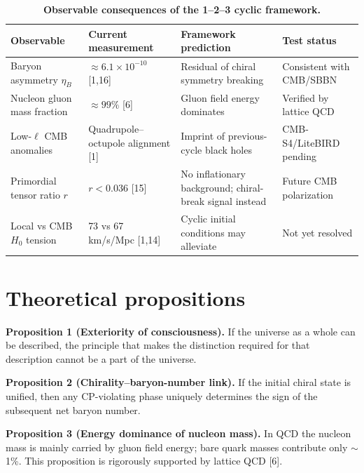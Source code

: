 \documentclass[11pt,a4paper]{article}
\begin{document}
\begin{table}[htbp] \centering \caption{\textbf{Observable consequences of the 1--2--3 cyclic framework.}} \label{tab:predictions} \small \begin{tabular}{@{}p{2.8cm}p{3.6cm}p{4.8cm}p{2.2cm}@{}} \toprule Observable & Current measurement & Framework prediction & Test status \\ \midrule Baryon asymmetry $\eta_B$ & $\approx6.1\times10^{-10}$ [1,16] & Residual of chiral symmetry breaking & Consistent with CMB/SBBN \\ Nucleon gluon mass fraction & $\approx99\%$ [6] & Gluon field energy dominates & Verified by lattice QCD \\ Low-$\ell$ CMB anomalies & Quadrupole--octupole alignment [1] & Imprint of previous-cycle black holes & CMB-S4/LiteBIRD pending \\ Primordial tensor ratio $r$ & $r<0.036$ [15] & No inflationary background; chiral-break signal instead & Future CMB polarization \\ Local vs CMB $H_0$ tension & 73 vs 67 km/s/Mpc [1,14] & Cyclic initial conditions may alleviate & Not yet resolved \\ \bottomrule \end{tabular} \end{table}

\section{Theoretical propositions}

\textbf{Proposition 1 (Exteriority of consciousness).} If the universe as a whole can be described, the principle that makes the distinction required for that description cannot be a part of the universe.

\textbf{Proposition 2 (Chirality--baryon-number link).} If the initial chiral state is unified, then any CP-violating phase uniquely determines the sign of the subsequent net baryon number.

\textbf{Proposition 3 (Energy dominance of nucleon mass).} In QCD the nucleon mass is mainly carried by gluon field energy; bare quark masses contribute only $\sim$1\%. This proposition is rigorously supported by lattice QCD [6].
\end{document}
